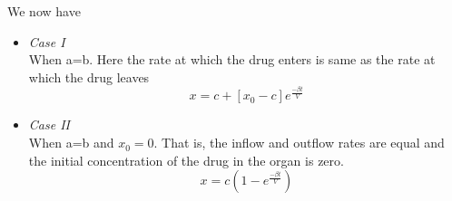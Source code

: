 We now have
\begin{itemize}
	
	\item \textit{Case I} \\
	When a=b. Here the rate at which the drug enters is same as the rate  at which the drug leaves 
	$$x=c+[x_{0}-c]e^{\frac{-\beta t}{V}}$$
	\item \textit{Case II} \\
	When a=b and $x_{0}=0$. That is, the inflow and outflow rates are equal  and the initial concentration of the drug in the organ is zero.
	$$x=c(1-e^{\frac{-\beta t}{V}})$$ 
\end{itemize}


